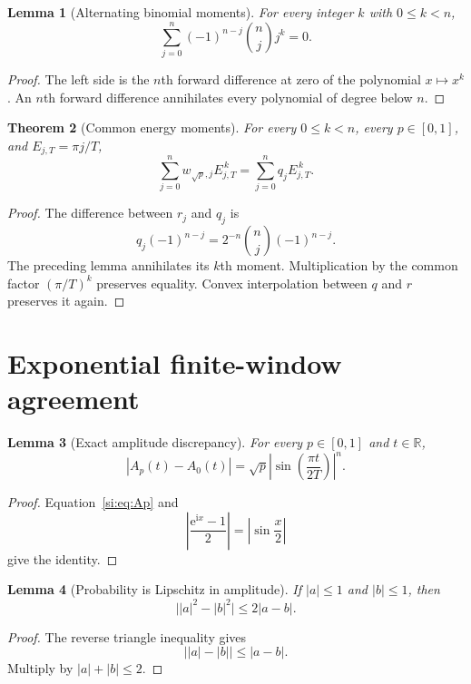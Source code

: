 \documentclass[12pt]{article}
\newtheorem{theorem}{Theorem}[section]
\newtheorem{lemma}[theorem]{Lemma}
\newcommand{\R}{\mathbb R}
\newcommand{\ee}{\mathrm e}
\newcommand{\ii}{\mathrm i}
\begin{document}
\begin{lemma}[Alternating binomial moments]
For every integer \(k\) with \(0\leq k<n\),
\[
\sum_{j=0}^{n}(-1)^{n-j}{n\choose j}j^k=0.
\]
\end{lemma}

\begin{proof}
The left side is the \(n\)th forward difference at zero of the polynomial
\(x\mapsto x^k\). An \(n\)th forward difference annihilates every
polynomial of degree below \(n\).
\end{proof}

\begin{theorem}[Common energy moments]
For every \(0\leq k<n\), every \(p\in[0,1]\), and
\(E_{j,T}=\pi j/T\),
\[
\sum_{j=0}^{n}w_{\sqrt p,j}E_{j,T}^{\,k}
=\sum_{j=0}^{n}q_jE_{j,T}^{\,k}.
\]
\end{theorem}

\begin{proof}
The difference between \(r_j\) and \(q_j\) is
\[
q_j(-1)^{n-j}=2^{-n}{n\choose j}(-1)^{n-j}.
\]
The preceding lemma annihilates its \(k\)th moment. Multiplication by the
common factor \((\pi/T)^k\) preserves equality. Convex interpolation between
\(q\) and \(r\) preserves it again.
\end{proof}

\section{Exponential finite-window agreement}

\begin{lemma}[Exact amplitude discrepancy]
For every \(p\in[0,1]\) and \(t\in\R\),
\[
 |A_p(t)-A_0(t)|
 =\sqrt p\left|\sin\left(\frac{\pi t}{2T}\right)\right|^n.
\]
\end{lemma}

\begin{proof}
Equation~\eqref{si:eq:Ap} and
\[
\left|\frac{\ee^{\ii x}-1}{2}\right|
=\left|\sin\frac{x}{2}\right|
\]
give the identity.
\end{proof}

\begin{lemma}[Probability is Lipschitz in amplitude]
If \(|a|\leq1\) and \(|b|\leq1\), then
\[
\bigl||a|^2-|b|^2\bigr|\leq2|a-b|.
\]
\end{lemma}

\begin{proof}
The reverse triangle inequality gives
\[
\bigl||a|-|b|\bigr|\leq|a-b|.
\]
Multiply by \(|a|+|b|\leq2\).
\end{proof}
\end{document}
